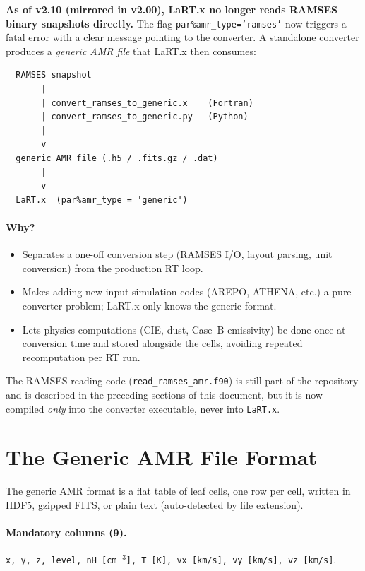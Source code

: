 \documentclass[english,a4paper]{my_memo}
\begin{document}
\textbf{As of v2.10 (mirrored in v2.00), LaRT.x no longer reads RAMSES binary
snapshots directly.}  The flag \texttt{par\%amr\_type='ramses'} now triggers
a fatal error with a clear message pointing to the converter.  A standalone
converter produces a \emph{generic AMR file} that LaRT.x then consumes:

\begin{verbatim}
  RAMSES snapshot
       |
       | convert_ramses_to_generic.x    (Fortran)
       | convert_ramses_to_generic.py   (Python)
       |
       v
  generic AMR file (.h5 / .fits.gz / .dat)
       |
       v
  LaRT.x  (par%amr_type = 'generic')
\end{verbatim}

\paragraph{Why?}
\begin{itemize}
\item Separates a one-off conversion step (RAMSES I/O, layout parsing,
      unit conversion) from the production RT loop.
\item Makes adding new input simulation codes (AREPO, ATHENA, etc.) a
      pure converter problem; LaRT.x only knows the generic format.
\item Lets physics computations (CIE, dust, Case~B emissivity) be done
      once at conversion time and stored alongside the cells, avoiding
      repeated recomputation per RT run.
\end{itemize}

The RAMSES reading code (\texttt{read\_ramses\_amr.f90}) is still part of
the repository and is described in the preceding sections of this document,
but it is now compiled \emph{only} into the converter executable, never
into \texttt{LaRT.x}.

\section{The Generic AMR File Format}

The generic AMR format is a flat table of leaf cells, one row per cell,
written in HDF5, gzipped FITS, or plain text (auto-detected by file
extension).

\paragraph{Mandatory columns (9).}
\texttt{x, y, z, level, nH [cm$^{-3}$], T [K], vx [km/s], vy [km/s],
vz [km/s]}.
\end{document}

